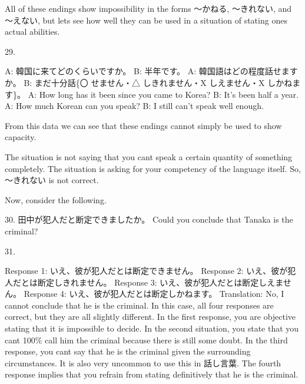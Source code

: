 \par{ All of these endings show impossibility in the forms ～かねる, ～きれない, and ～えない, but let\textquotesingle s see how well they can be used in a situation of stating one\textquotesingle s actual abilities. }

\par{29. }

\par{A: 韓国に来てどのくらいですか。 \hfill\break
B: 半年です。 \hfill\break
A: 韓国語はどの程度話せますか。 \hfill\break
B: まだ十分話\{〇 せません・△ しきれません・X しえません・X しかねます\}。 \hfill\break
A: How long has it been since you came to Korea? \hfill\break
B: It's been half a year. \hfill\break
A: How much Korean can you speak? \hfill\break
B: I still can't speak well enough. }

\par{ From this data we can see that these endings cannot simply be used to show capacity. }

\par{ The situation is not saying that you can\textquotesingle t speak a certain quantity of something completely. The situation is asking for your competency of the language itself. So, ～きれない is not correct. }

\par{ Now, consider the following. }

\par{30. 田中が犯人だと断定できましたか。 \hfill\break
Could you conclude that Tanaka is the criminal? \hfill\break
 }

\par{31. }

\par{Response 1: いえ、彼が犯人だとは断定できません。 \hfill\break
Response 2: いえ、彼が犯人だとは断定しきれません。 \hfill\break
Response 3: いえ、彼が犯人だとは断定しえません。 \hfill\break
Response 4: いえ、彼が犯人だとは断定しかねます。 \hfill\break
Translation: No, I cannot conclude that he is the criminal. \hfill\break
\hfill\break
 In this case, all four responses are correct, but they are all slightly different. In the first response, you are objective stating that it is impossible to decide. In the second situation, you state that you can\textquotesingle t 100\% call him the criminal because there is still some doubt. In the third response, you can\textquotesingle t say that he is the criminal given the surrounding circumstances. It is also very uncommon to use this in 話し言葉. The fourth response implies that you refrain from stating definitively that he is the criminal. }

